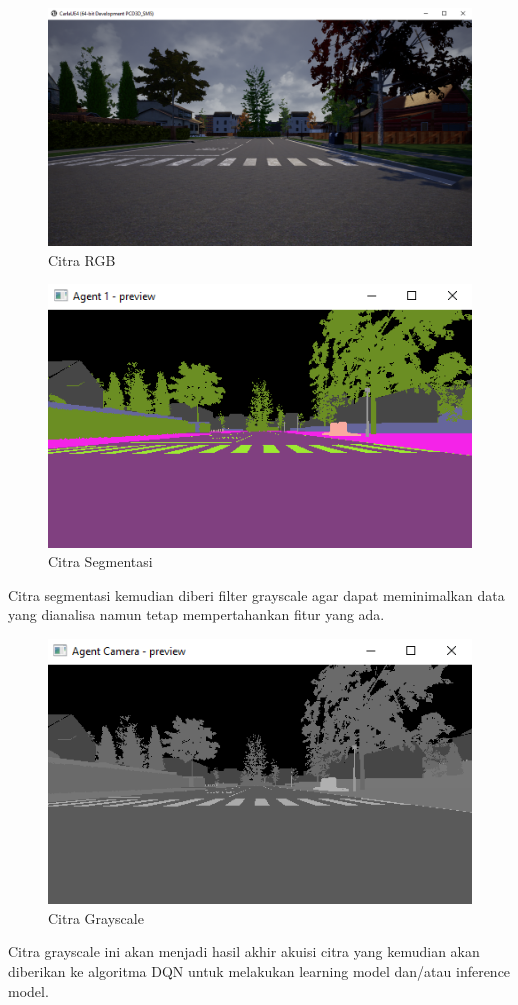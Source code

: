 \begin{figure}[H] 
	\centering
	\includegraphics[width=.7\linewidth]{images/rgb}
	\caption{Citra RGB}
	\label{fig:citra_rgb}
\end{figure}
\begin{figure}[H] 
	\centering
	\includegraphics[width=.7\linewidth]{images/segmentasi}
	\caption{Citra Segmentasi}
	\label{fig:segmentasi}
\end{figure}
Citra segmentasi kemudian diberi filter grayscale agar dapat meminimalkan data yang dianalisa namun tetap mempertahankan fitur yang ada.
\begin{figure}[H] 
	\centering
	\includegraphics[width=.7\linewidth]{images/grayscale}
	\caption{Citra Grayscale}
	\label{fig:grayscale}
\end{figure}
Citra grayscale ini akan menjadi hasil akhir akuisi citra yang kemudian akan diberikan ke algoritma DQN untuk melakukan learning model dan/atau inference model.

